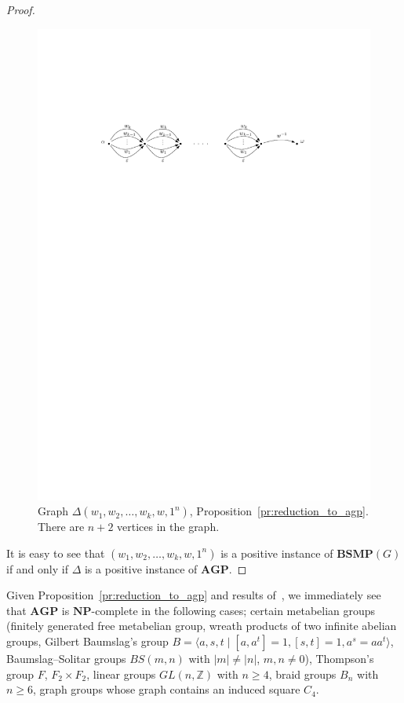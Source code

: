 \documentclass[10pt]{amsart}
\theoremstyle{definition}
\def\NP{{\mathbf{NP}}}
\def\BSMP{{\mathbf{BSMP}}}
\def\AGP{{\mathbf{AGP}}}
\begin{document}
\begin{proof}
\begin{figure}[h]
 \centering
 \includegraphics[width=4.5in]{bsmp}
 \caption{Graph $\Delta(w_1,w_2,\ldots,w_k,w,1^n)$, Proposition~\ref{pr:reduction_to_agp}. There are $n+2$ vertices in the graph.}\label{fi:BSMP}
\end{figure}
It is easy to see that $(w_1,w_2,\ldots,w_k,w,1^n)$ is a positive instance of $\BSMP(G)$ if and only if $\Delta$ is a positive instance of $\AGP$.
\end{proof}

Given Proposition~\ref{pr:reduction_to_agp} and results of~\cite{Miasnikov-Nikolaev-Ushakov:2014a}, we immediately see that $\AGP$ is $\NP$-complete in the following cases; certain metabelian groups (finitely generated free metabelian group, wreath products of two infinite abelian groups, Gilbert Baumslag's group $B=\langle a,s,t\mid [a,a^t]=1, [s,t]=1, a^s=aa^t\rangle$, Baumslag--Solitar groups $BS(m,n)$ with $|m|\neq |n|$, $m,n\neq 0$), Thompson's group $F$, $F_2\times F_2$, linear groups $GL(n, \mathbb Z)$ with $n\ge 4$, braid groups $B_n$ with $n\ge 6$, graph groups whose graph contains an induced square $C_4$.
\end{document}
